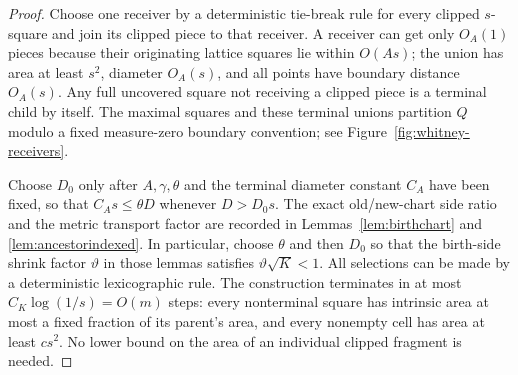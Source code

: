 \documentclass[11pt]{article}
\theoremstyle{definition}
\theoremstyle{remark}
\numberwithin{equation}{section}
\begin{document}
\begin{proof}
Choose one receiver by a deterministic tie-break rule for every clipped
$s$-square and join its clipped piece to that receiver. A receiver can get
only $O_A(1)$ pieces because their originating lattice squares lie within
$O(As)$; the union has area at least $s^2$, diameter $O_A(s)$, and all
points have boundary distance $O_A(s)$. Any full uncovered square not
receiving a clipped piece is a terminal child by itself. The maximal
squares and these terminal unions partition $Q$ modulo a fixed
measure-zero boundary convention; see Figure~\ref{fig:whitney-receivers}.

Choose $D_0$ only after $A,\gamma,\theta$ and the terminal diameter
constant $C_A$ have been fixed, so that $C_As\le\theta D$ whenever
$D>D_0s$. The exact old/new-chart side ratio and the metric transport factor
are recorded in Lemmas~\ref{lem:birthchart} and
\ref{lem:ancestorindexed}. In particular, choose $\theta$ and then
$D_0$ so that the birth-side shrink factor $\vartheta$ in those
lemmas satisfies $\vartheta\sqrt K<1$.
All selections can be made by a deterministic lexicographic rule.
The construction terminates in at most $C_K\log(1/s)=O(m)$
steps: every nonterminal square has intrinsic area at most a fixed
fraction of its parent's area, and every nonempty cell has area
at least $c s^2$. No lower bound on the area of an individual
clipped fragment is needed.
\end{proof}
\end{document}
